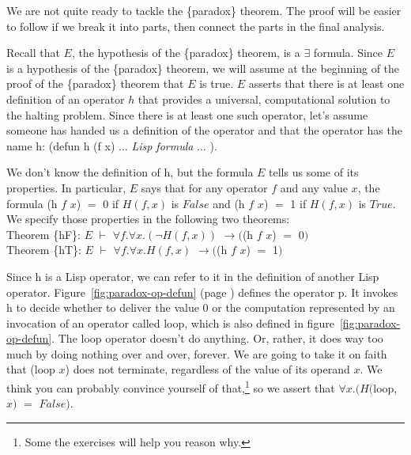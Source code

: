We are not quite ready to tackle the \{paradox\} theorem.
The proof will be easier to follow if we break it into parts,
then connect the parts in the final analysis.

Recall that $E$, the hypothesis of the \{paradox\} theorem,
is a $\exists$ formula.
Since $E$ is a hypothesis of the \{paradox\} theorem,
we will assume at the beginning of the proof
of the \{paradox\} theorem that $E$ is true.
$E$ asserts that there is at least one definition of
an operator $h$ that provides a universal, computational solution
to the halting problem.
Since there is at least one such operator,
let's assume someone has handed us a
definition of the operator and that the operator has the name \textsf{h}:
\textsf{(defun h (f x)}  $\dots$ \emph{Lisp formula} $\dots$ \textsf{)}.

We don't know the definition of \textsf{h}, but the formula $E$
tells us some of its properties.
In particular, $E$ says that for any operator $f$ and any value $x$,
the formula \textsf{(h $f$ $x$)} $=$ \textsf{0} if $H(f, x)$ is $False$ and
\textsf{(h $f$ $x$)} $=$ \textsf{1} if $H(f,x)$ is $True$.
We specify those properties in the following two theorems:
\vspace{2mm}\\
\hspace*{5mm}Theorem \{hF\}: $E$ $\vdash$ $\forall f.\forall x.(\neg H(f, x))$ $\rightarrow ($\textsf{(h $f$ $x$)} $=$ \textsf{0}$)$\\
\hspace*{5mm}Theorem \{hT\}: $E$ $\vdash$ $\forall f.\forall x.H(f, x)$      $\rightarrow ($\textsf{(h $f$ $x$)} $=$ \textsf{1}$)$
\vspace{2mm}

Since \textsf{h} is a Lisp operator, we can refer to it in the definition of
another Lisp operator.
Figure~\ref{fig:paradox-op-defun} (page \pageref{fig:paradox-op-defun})
defines the operator \textsf{p}.
It invokes \textsf{h} to decide whether to deliver the value \textsf{0} or
the computation represented by an invocation of an operator called \textsf{loop},
which is also defined in
figure~\ref{fig:paradox-op-defun}.
The \textsf{loop} operator doesn't do anything. %
Or, rather,
it does way too much by doing nothing over and over, forever.
We are going to take it on faith that \textsf{(loop $x$)} does not terminate,
regardless of the value of its operand $x$.
We think you can probably convince yourself of that,\footnote{Some
the exercises will help you reason why.}
so we assert that $\forall x.(H($\textsf{loop}, $x)$ $=$ $False)$.


